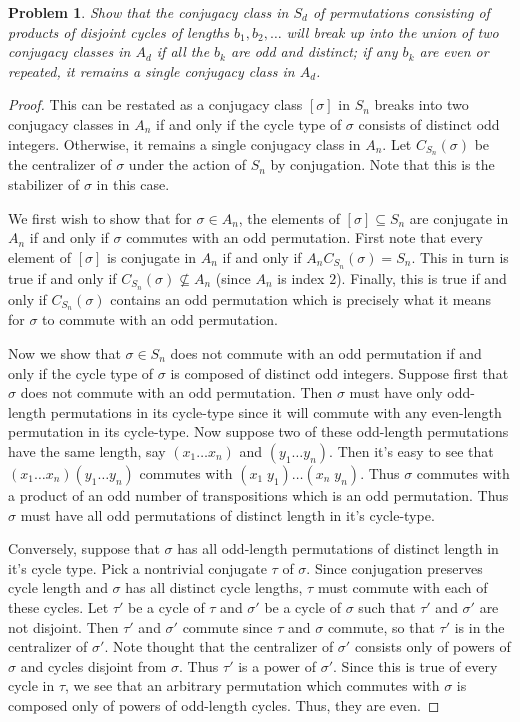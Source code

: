 \documentclass{article}
\newtheorem{problem}{Problem}
\begin{document}
\begin{problem}
Show that the conjugacy class in $S_d$ of permutations consisting of products of disjoint cycles of lengths $b_1, b_2, \dots$ will break up into the union of two conjugacy classes in $A_d$ if all the $b_k$ are odd and distinct; if any $b_k$ are even or repeated, it remains a single conjugacy class in $A_d$.
\end{problem}
\begin{proof}
This can be restated as a conjugacy class $[\sigma]$ in $S_n$ breaks into two conjugacy classes in $A_n$ if and only if the cycle type of $\sigma$ consists of distinct odd integers. Otherwise, it remains a single conjugacy class in $A_n$. Let $C_{S_n}(\sigma)$ be the centralizer of $\sigma$ under the action of $S_n$ by conjugation. Note that this is the stabilizer of $\sigma$ in this case.

We first wish to show that for $\sigma \in A_n$, the elements of $[\sigma] \subseteq S_n$ are conjugate in $A_n$ if and only if $\sigma$ commutes with an odd permutation. First note that every element of $[\sigma]$ is conjugate in $A_n$ if and only if $A_nC_{S_n}(\sigma) = S_n$. This in turn is true if and only if $C_{S_n}(\sigma) \nsubseteq A_n$ (since $A_n$ is index $2$). Finally, this is true if and only if $C_{S_n}(\sigma)$ contains an odd permutation which is precisely what it means for $\sigma$ to commute with an odd permutation.

Now we show that $\sigma \in S_n$ does not commute with an odd permutation if and only if the cycle type of $\sigma$ is composed of distinct odd integers. Suppose first that $\sigma$ does not commute with an odd permutation. Then $\sigma$ must have only odd-length permutations in its cycle-type since it will commute with any even-length permutation in its cycle-type. Now suppose two of these odd-length permutations have the same length, say $(x_1 \dots x_n)$ and $(y_1 \dots y_n)$. Then it's easy to see that $(x_1 \dots x_n)(y_1 \dots y_n)$ commutes with $(x_1 \; y_1) \dots (x_n \; y_n)$. Thus $\sigma$ commutes with a product of an odd number of transpositions which is an odd permutation. Thus $\sigma$ must have all odd permutations of distinct length in it's cycle-type.

Conversely, suppose that $\sigma$ has all odd-length permutations of distinct length in it's cycle type. Pick a nontrivial conjugate $\tau$ of $\sigma$. Since conjugation preserves cycle length and $\sigma$ has all distinct cycle lengths, $\tau$ must commute with each of these cycles. Let $\tau'$ be a cycle of $\tau$ and $\sigma'$ be a cycle of $\sigma$ such that $\tau'$ and $\sigma'$ are not disjoint. Then $\tau'$ and $\sigma'$ commute since $\tau$ and $\sigma$ commute, so that $\tau'$ is in the centralizer of $\sigma'$. Note thought that the centralizer of $\sigma'$ consists only of powers of $\sigma$ and cycles disjoint from $\sigma$. Thus $\tau'$ is a power of $\sigma'$. Since this is true of every cycle in $\tau$, we see that an arbitrary permutation which commutes with $\sigma$ is composed only of powers of odd-length cycles. Thus, they are even.


\end{proof}
\end{document}
